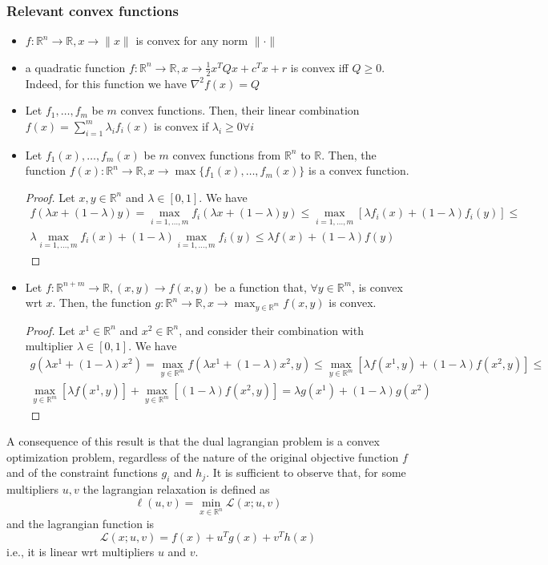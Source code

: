 \documentclass{book}
\newcommand{\R}{\mathbb{R}}
\theoremstyle{theoremv2}
\theoremstyle{defv2}
\theoremstyle{remark}
\theoremstyle{remark}
\begin{document}
\subsubsection{Relevant convex functions}
\begin{itemize}
    \item $f:\R^n\to\R,x\to\|x\|$ is convex for any norm $\|\cdot\|$
        \item a quadratic function $f:\R^n\to\R,x\to\frac{1}{2}x^TQx + c^Tx +r$ is convex iff $Q\geq0$. Indeed, for this function we have $\nabla^2 f(x)=Q$
        \item Let $f_1,\dots,f_m$ be $m$ convex functions. Then, their linear combination $f(x) = \sum_{i=1}^{m}\lambda_if_i(x)$ is convex if $\lambda_i\geq0\forall i$
        \item Let $f_1(x),\dots,f_m(x)$ be $m$ convex functions from $\R^n$ to $\R$. Then, the function $f(x):\R^n\to\R,x\to\max\{f_1(x),\dots,f_m(x)\}$ is a convex function.
            \begin{proof}
                Let $x,y\in\R^n$ and $\lambda\in[0,1]$. We have 
                \begin{gather*}
                    f\left(\lambda x + (1-\lambda)y\right) = \max_{i=1,\dots,m}f_i\left(\lambda x + (1-\lambda)y\right)\leq \max_{i=1,\dots,m}[\lambda f_i(x) + (1-\lambda)f_i(y)] \leq \\
                    \lambda \max_{i=1,\dots,m}f_i(x) + (1-\lambda)\max_{i=1,\dots,m}f_i(y)\leq \lambda f (x) + (1-\lambda)f(y)
                \end{gather*}
            \end{proof}
        \item Let $f:\R^{n+m}\to\R,(x,y)\to f(x,y)$ be a function that, $\forall y \in \R^m$, is convex wrt $x$. Then, the function $g:\R^n\to\R,x\to\max_{y\in\R^m}f(x,y)$ is convex.
            \begin{proof}
                Let $x^1\in\R^n$ and $x^2\in\R^n$, and consider their combination with multiplier $\lambda\in[0,1]$. We have 
                \begin{align*}
                    g\left(\lambda x^1 + (1-\lambda)x^2\right) = \max_{y\in\R^m}f\left(\lambda x^1 + (1-\lambda)x^2,y\right)\leq \max_{y\in\R^m}[\lambda f(x^1,y)+(1-\lambda)f(x^2,y)] \leq \\
                    \max_{y\in\R^m}[\lambda f(x^1,y)]+\max_{y\in\R^m}[(1-\lambda)f(x^2,y)] = \lambda g(x^1) + (1-\lambda)g(x^2)
                \end{align*}
            \end{proof}
\end{itemize}
A consequence of this result is that the dual lagrangian problem is a convex optimization problem, regardless of the nature of the original objective function $f$ and of the constraint functions $g_i$ and $h_j$. It is sufficient to observe that, for some multipliers $u,v$ the lagrangian relaxation is defined as 
\[
    \ell(u,v) = \min_{x\in\R^n}\mathcal{L}(x;u,v)
\]
and the lagrangian function is 
\[
    \mathcal{L}(x;u,v) = f(x) + u^T g(x) + v^Th(x)
\]
i.e., it is linear wrt multipliers $u$ and $v$.
\end{document}
